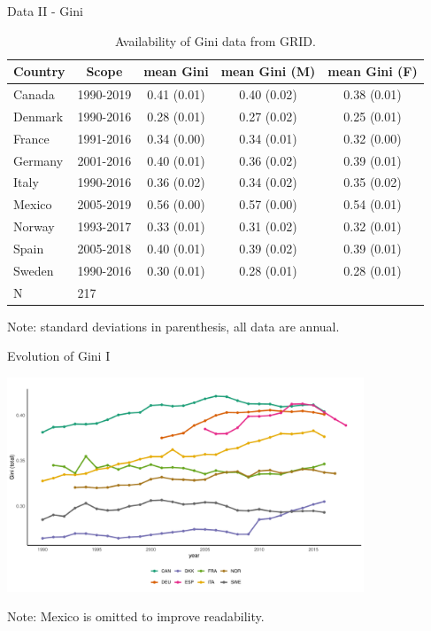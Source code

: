 \documentclass[10pt,leqno,aspectratio=169,presentation]{beamer} %
\begin{document}
\begin{frame}{Data II - Gini}
    \begin{table}[H]
\captionsetup{justification=raggedright, singlelinecheck=false}
    \centering
    \caption{Availability of Gini data from GRID.}
    \begin{tabular}{l c c c c}
    \toprule
       Country & Scope & mean Gini & mean Gini (M) & mean Gini (F) \\
    \midrule
       Canada   & 1990-2019  & 0.41 (0.01) & 0.40 (0.02) & 0.38 (0.01) \\ 
       Denmark  & 1990-2016  & 0.28 (0.01) & 0.27 (0.02) & 0.25 (0.01) \\ 
       France   & 1991-2016  & 0.34 (0.00) & 0.34 (0.01) & 0.32 (0.00) \\ 
       Germany  & 2001-2016  & 0.40 (0.01) & 0.36 (0.02) & 0.39 (0.01) \\ 
       Italy    & 1990-2016  & 0.36 (0.02) & 0.34 (0.02) & 0.35 (0.02) \\ 
       Mexico   & 2005-2019  & 0.56 (0.00) & 0.57 (0.00) & 0.54 (0.01) \\ 
       Norway   & 1993-2017  & 0.33 (0.01) & 0.31 (0.02) & 0.32 (0.01) \\ 
       Spain    & 2005-2018  & 0.40 (0.01) & 0.39 (0.02) & 0.39 (0.01) \\ 
       Sweden   & 1990-2016  & 0.30 (0.01) & 0.28 (0.01) & 0.28 (0.01) \\ 
    \midrule
       \multicolumn{1}{l}{N} & \multicolumn{4}{l}{217} \\
    \bottomrule
    \end{tabular}
    
    \vspace{0.2cm}
    \raggedright\footnotesize Note: standard deviations in parenthesis, all data are annual.
\end{table}
\end{frame}

\begin{frame}{Evolution of Gini I}
    \begin{center}
    \includegraphics[width=0.80\textwidth]{Slides/Gini_no_MEX.pdf}
    \vspace{0.2cm} %
    \begin{minipage}{0.85\textwidth}
    \footnotesize
    Note: Mexico is omitted to improve readability.
    \end{minipage}
\end{center}
\end{frame}
\end{document}
